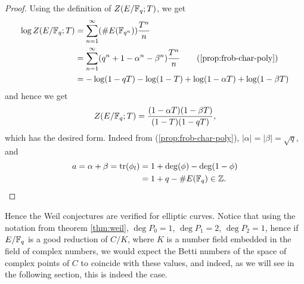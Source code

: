 \begin{proof}
	Using the definition of $Z(E/\mathbb{F}_q; T)$, we get
	\begin{align*}
		\log Z(E/\mathbb{F}_q; T) &= \sum_{n=1}^\infty (\#E(\mathbb{F}_{q^n}))\frac{T^n}{n}\\
		&= \sum_{n=1}^\infty (q^n + 1 - \alpha^n - \beta^n)\frac{T^n}{n}
		\qquad \textrm{(\ref{prop:frob-char-poly})}\\
		&= -\log(1 - qT) - \log(1 - T) + \log(1 - \alpha T) + \log(1 - \beta T)
	\end{align*}
	and hence we get
	\begin{equation*}
		Z(E/\mathbb{F}_q; T) = \frac{(1 - \alpha T)(1 - \beta T)}{(1 - T)(1 - qT)},
	\end{equation*}
	which has the desired form.
	Indeed from (\ref{prop:frob-char-poly}), 
	$|\alpha| = |\beta| = \sqrt{q}$, and
	\begin{align*}
		a = \alpha + \beta = \operatorname{tr}(\phi_l) &= 1 + \deg(\phi) - \deg(1 - \phi)\\
		&= 1 + q - \#E(\mathbb{F}_q) \in \mathbb{Z}.
	\end{align*}
\end{proof}

Hence the Weil conjectures are verified for elliptic curves. Notice that
using the notation from theorem \ref{thm:weil},
$\deg P_0 = 1$, $\deg P_1 = 2$, $\deg P_2 = 1$, hence if $E/\mathbb{F}_q$ is a good
reduction of $C/K$, where $K$ is a number field embedded in
the field of complex numbers, we would expect
the Betti numbers of the space of complex points of $C$ 
to coincide with these values, and indeed, as we
will see in the following section, this is indeed the case.
